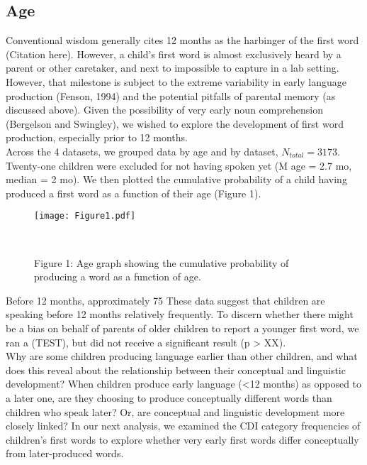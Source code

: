 \documentclass[10pt,letterpaper]{article}
\begin{document}
\subsection{Age} 
Conventional wisdom generally cites 12 months as the harbinger of the first word (Citation here). However, a child's first word is almost exclusively heard by a parent or other caretaker, and next to impossible to capture in a lab setting. However, that milestone is subject to the extreme variability in early language production (Fenson, 1994) and the potential pitfalls of parental memory (as discussed above). Given the possibility of very early noun comprehension (Bergelson and Swingley), we wished to explore the development of first word production, especially prior to 12 months.  \\
Across the 4 datasets, we grouped data by age and by dataset, $N_{total} = 3173$. Twenty-one children were excluded for not having spoken yet (M age  = 2.7 mo, median = 2 mo). We then plotted the cumulative probability of a child having produced a first word as a function of their age (Figure 1).

\begin{figure}[t]
\begin{center}
\texttt{[image: Figure1.pdf]}
\end{center}
\caption{Figure 1: Age graph showing the cumulative probability of producing a word as a function of age.}\
\end{figure}

Before 12 months, approximately 75%
These data suggest that children are speaking before 12 months relatively frequently. To discern whether there might be a bias on behalf of parents of older children to report a younger first word, we ran a (TEST), but did not receive a significant result (p > XX). \\
Why are some children producing language earlier than other children, and what does this reveal about the relationship between their conceptual and linguistic development? When children produce early language (<12 months) as opposed to a later one, are they choosing to produce conceptually different words than children who speak later? Or, are conceptual and linguistic development more closely linked? In our next analysis, we examined the CDI category frequencies of children's first words to explore whether very early first words differ conceptually from later-produced words. 
\end{document}
